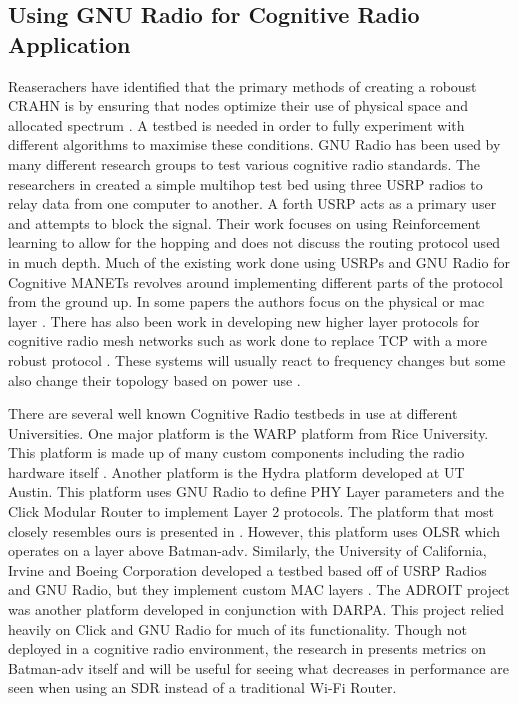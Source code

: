 \subsection{Using GNU Radio for Cognitive Radio Application}

Reaserachers have identified that the primary methods of creating a roboust CRAHN is by ensuring
that nodes optimize their use of physical space and allocated spectrum \cite{6846075}. A testbed is
needed in order to fully experiment with different algorithms to maximise these conditions. 
GNU Radio has been used by many different research groups to test various cognitive radio
standards. The researchers in \cite{7141228} created a simple multihop test bed using
three USRP radios to relay data from one computer to another. A forth USRP acts as a primary
user and attempts to block the signal. Their work focuses on using Reinforcement learning to allow
for the hopping and does not discuss the routing protocol used in much depth. Much of the 
existing work done using USRPs and GNU Radio for Cognitive MANETs revolves around implementing
different parts of the protocol from the ground up. In some papers the authors focus on
the physical or mac layer \cite{5508221}. There has also been work in developing new higher 
layer protocols for cognitive radio mesh networks such as work done to replace 
TCP with a more robust protocol \cite{6686523} . These systems will usually 
react to frequency changes but some also change their topology based on power use \cite{6983150}. 

There are several well known Cognitive Radio testbeds in use at different Universities. 
One major platform is the WARP platform from Rice University. This platform is made up of many
custom components including the radio hardware itself \cite{7071706}. Another platform is the
Hydra platform developed at UT Austin. This platform uses GNU Radio to define PHY Layer parameters
and the Click Modular Router to implement Layer 2 protocols.\cite{4212821} The platform that
most closely resembles ours is presented in \cite{0002}. However, this platform uses OLSR which 
operates on a layer above Batman-adv. Similarly, the University of California, Irvine and Boeing 
Corporation developed a testbed based off of USRP Radios and GNU Radio, but they implement
custom MAC layers \cite{4753441}. The ADROIT project was another platform developed in conjunction
with DARPA. This project relied heavily on Click and GNU Radio for much of its functionality.
\cite{4286321} Though not deployed in a cognitive radio
environment, the research in \cite{6115569} presents metrics on Batman-adv itself and
will be useful for seeing what decreases in performance are seen when using an SDR instead
of a traditional Wi-Fi Router. 
